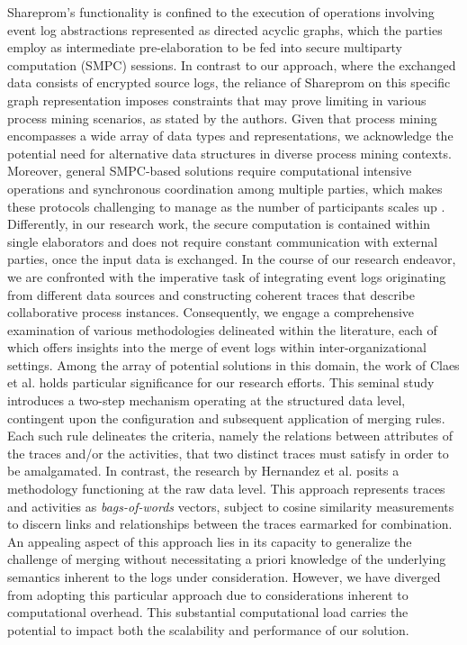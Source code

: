 Shareprom's functionality is confined to the execution of operations involving event log abstractions \cite{FederatedPM2021} represented as directed acyclic graphs, which the parties employ as intermediate pre-elaboration to be fed into secure multiparty computation (SMPC) \cite{SMPC2015} sessions. In contrast to our approach, where the exchanged data consists of encrypted source logs, the reliance of Shareprom on this specific graph representation imposes constraints that may prove limiting in various process mining scenarios, as stated by the authors. Given that process mining encompasses a wide array of data types and representations, we acknowledge the potential need for alternative data structures in diverse process mining contexts. Moreover, general SMPC-based solutions require computational intensive operations and synchronous coordination among multiple parties, which makes these protocols challenging to manage as the number of participants scales up \cite{SMPC2019}. Differently, in our research work, the secure computation is contained within single elaborators and does not require constant communication with external parties, once the input data is exchanged. In the course of our research endeavor, we are confronted with the imperative task of integrating event logs originating from different data sources and constructing coherent traces that describe collaborative process instances. Consequently, we engage a comprehensive examination of various methodologies delineated within the literature, each of which offers insights into the merge of event logs within inter-organizational settings.
Among the array of potential solutions in this domain, the work of Claes et al. \cite{claes2014merging} holds particular significance for our research efforts. This seminal study introduces a two-step mechanism operating at the structured data level, contingent upon the configuration and subsequent application of merging rules. Each such rule delineates the criteria, namely the relations between attributes of the traces and/or the activities, that two distinct traces must satisfy in order to be amalgamated. In contrast, the research by Hernandez et al. \cite{hernandez2021merging} posits a methodology functioning at the raw data level. This approach represents traces and activities as \textit{bags-of-words} vectors, subject to cosine similarity measurements to discern links and relationships between the traces earmarked for combination. An appealing aspect of this approach lies in its capacity to generalize the challenge of merging without necessitating a priori knowledge of the underlying semantics inherent to the logs under consideration. However, we have diverged from adopting this particular approach due to considerations inherent to computational overhead. This substantial computational load carries the potential to impact both the scalability and performance of our solution.





